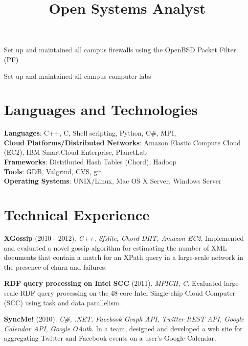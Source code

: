 \documentclass[margin,line]{resume}
\begin{document}
\begin{resume}
\newpage

    \title{\textbf{Open Systems Analyst}}
    \begin{position}
    \vspace{-2mm}
    \begin{list2}
    \item Set up and maintained all campus firewalls using the OpenBSD Packet Filter (PF)
    \item Set up and maintained all campus computer labs
    \end{list2}
    \end{position}

    \section{\mysidestyle Languages and Technologies} 

    \textbf{Languages}: C++, C, Shell scripting, Python, C\#, MPI, \LaTeXe\\
    \textbf{Cloud Platforms/Distributed Networks}: Amazon Elastic Compute Cloud (EC2), IBM SmartCloud Enterprise, PlanetLab\\
    \textbf{Frameworks}: Distributed Hash Tables (Chord), Hadoop\\
    \textbf{Tools}: GDB, Valgrind, CVS, git\\
    \textbf{Operating Systems}: {\sc UNIX}/Linux, Mac OS X Server, Windows Server
    
    \section{\mysidestyle Technical Experience}
    
    \textbf{XGossip} (2010 - 2012). \textsl{C++, Sfslite, Chord DHT, Amazon EC2}. Implemented and evaluated a novel gossip algorithm for estimating the number of XML documents that contain a match for an XPath query in a large-scale network in the presence of churn and failures.

\vspace{-2mm}
    \textbf{RDF query processing on Intel SCC} (2011). \textsl{MPICH, C}. Evaluated large-scale RDF query processing on the 48-core Intel Single-chip Cloud Computer (SCC) using task and data parallelism.
    
\vspace{-2mm}
    \textbf{SyncMe!} (2010). \textsl{C\#, .NET, Facebook Graph API, Twitter REST API, Google Calendar API, Google OAuth}. In a team, designed and developed a web site for aggregating Twitter and Facebook events on a user's Google Calendar.


\end{resume}
\end{document}
